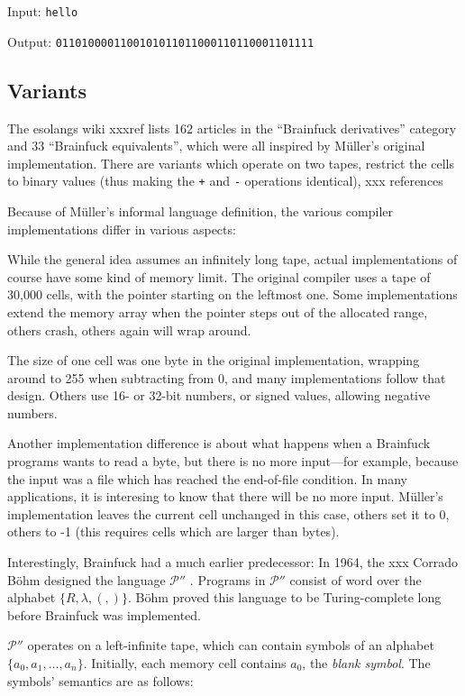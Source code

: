


Input: \texttt{hello}

Output: \texttt{0110100001100101011011000110110001101111}

\subsection{Variants}

The esolangs wiki xxxref lists 162 articles in the “Brainfuck derivatives” category and 33 “Brainfuck equivalents”, which were all inspired by Müller's original implementation. There are variants which operate on two tapes, restrict the cells to binary values (thus making the \texttt{+} and \texttt{-} operations identical), xxx references

Because of Müller's informal language definition, the various compiler implementations differ in various aspects:

While the general idea assumes an infinitely long tape, actual implementations of course have some kind of memory limit. The original compiler uses a tape of 30,000 cells, with the pointer starting on the leftmost one. Some implementations extend the memory array when the pointer steps out of the allocated range, others crash, others again will wrap around.

The size of one cell was one byte in the original implementation, wrapping around to 255 when subtracting from 0, and many implementations follow that design. Others use 16- or 32-bit numbers, or signed values, allowing negative numbers.

Another implementation difference is about what happens when a Brainfuck programs wants to read a byte, but there is no more input---for example, because the input was a file which has reached the end-of-file condition. In many applications, it is interesing to know that there will be no more input. Müller's implementation leaves the current cell unchanged in this case, others set it to 0, others to -1 (this requires cells which are larger than bytes).

Interestingly, Brainfuck had a much earlier predecessor: In 1964, the xxx Corrado Böhm designed the language $\mathcal{P}''$ \cite{bohm1964family}. Programs in $\mathcal{P}''$ consist of word over the alphabet $\{R, \lambda, (, )\}$.
Böhm proved this language to be Turing-complete long before Brainfuck was implemented.

$\mathcal{P}''$ operates on a left-infinite tape, which can contain symbols of an alphabet $\{a_0, a_1, \dots, a_n\}$. Initially, each memory cell contains $a_0$, the \emph{blank symbol}. The symbols' semantics are as follows:

